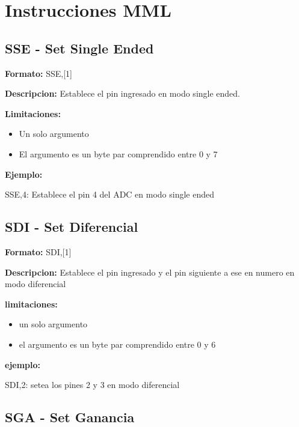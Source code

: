 \section{Instrucciones MML}\label{ap:instrucciones}

\subsection{SSE - Set Single Ended} %
\label{sub:sse_set_single_ended}


\textbf{Formato:} SSE,[1]

\textbf{Descripcion:}
Establece el pin ingresado en modo single ended.

\textbf{Limitaciones:}
\begin{itemize}
  \item Un solo argumento
  \item El argumento es un byte par comprendido entre 0 y 7
\end{itemize}

\textbf{Ejemplo:}

SSE,4: Establece el pin 4 del ADC en modo single ended


\subsection{SDI - Set Diferencial} %
\label{sub:sdi_set_diferencial}


\textbf{Formato:} SDI,[1]

\textbf{Descripcion:}
Establece el pin ingresado y el pin siguiente a ese en numero en modo diferencial

\textbf{limitaciones:}
\begin{itemize}
  \item un solo argumento
  \item el argumento es un byte par comprendido entre 0 y 6
\end{itemize}

\textbf{ejemplo:}

SDI,2: setea los pines 2 y 3 en modo diferencial


\subsection{SGA - Set Ganancia} %
\label{sub:sga_set_ganancia}


